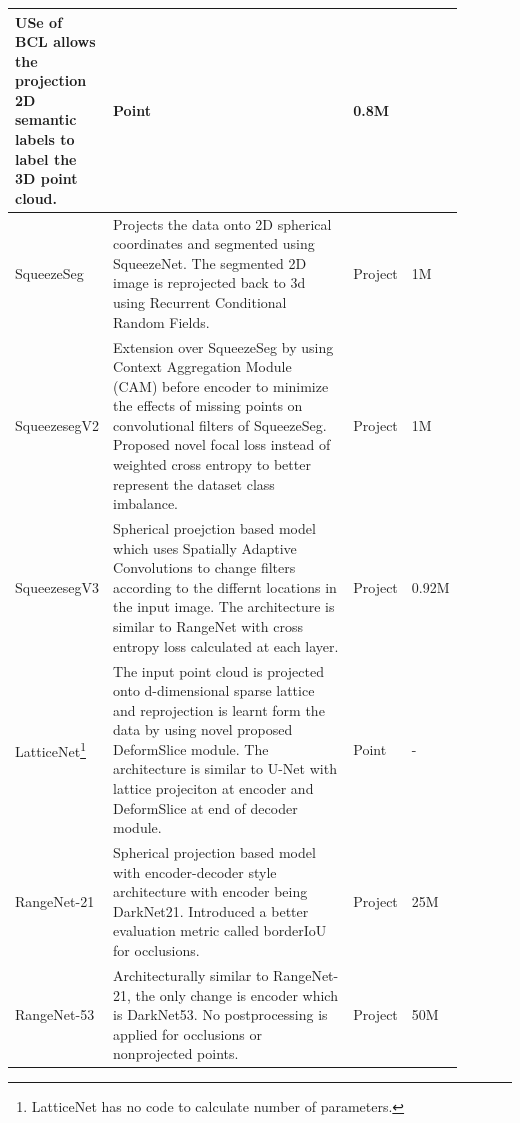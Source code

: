 \begin{longtable}{|p{0.15\linewidth} | p{0.59\linewidth}| p{0.06\linewidth} |p{0.09\linewidth}|}
            USe of BCL allows the projection 2D semantic labels to label the 3D point cloud.
            & Point & 0.8M \\
            \hline
            SqueezeSeg\cite{Sequeseseg_2018} &
            Projects the data onto 2D spherical coordinates and segmented using SqueezeNet.
            The segmented 2D image is reprojected back to 3d using Recurrent Conditional Random Fields.
            & Project & 1M \\
            \hline
            SqueezesegV2\cite{SqueezeSegv2} &
            Extension over SqueezeSeg by using Context Aggregation Module (CAM) before encoder to minimize the effects of missing points on convolutional filters of SqueezeSeg.
            Proposed novel focal loss instead of weighted cross entropy to better represent the dataset class imbalance.
            & Project & 1M \\
            \hline
            SqueezesegV3\cite{xu2020squeezesegv3} &
            Spherical proejction based model which uses Spatially Adaptive Convolutions to change filters according to the differnt locations in the input image.
            The architecture is similar to RangeNet with cross entropy loss calculated at each layer.
            & Project & 0.92M \\
            \hline
            LatticeNet\cite{rosu2019latticenet}\footnote{LatticeNet has no code to calculate number of parameters.} &
            The input point cloud is projected onto d-dimensional sparse lattice and reprojection is learnt form the data by using novel proposed DeformSlice module.
            The architecture is similar to U-Net with lattice projeciton at encoder and DeformSlice at end of decoder module.
            & Point & - \\
            \hline
            RangeNet-21\cite{Milioto2019} & 
            Spherical projection based model with encoder-decoder style architecture with encoder being DarkNet21.
            Introduced a better evaluation metric called borderIoU for occlusions.
            & Project & 25M \\
            \hline
            RangeNet-53\cite{Milioto2019}  & 
            Architecturally similar to RangeNet-21, the only change is encoder which is DarkNet53.
            No postprocessing is applied for occlusions or nonprojected points.
            & Project & 50M \\
            \hline

\end{longtable}
